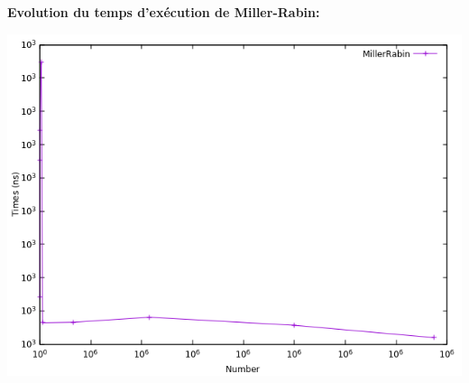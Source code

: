 		\begin{frame}
		\textbf{Evolution du temps d'exécution de Miller-Rabin: }
		\begin{center}\includegraphics[scale=0.5]{miller.png}\end{center}
		\end{frame}
		
